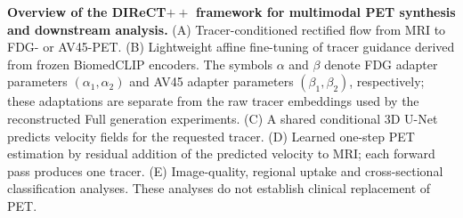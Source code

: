 \caption{\textbf{Overview of the DIReCT$++$ framework for multimodal PET synthesis and downstream analysis.}
(A) Tracer-conditioned rectified flow from MRI to FDG- or AV45-PET. (B) Lightweight affine fine-tuning of tracer guidance derived from frozen BiomedCLIP encoders. The symbols $\alpha$ and $\beta$ denote FDG adapter parameters $(\alpha_1,\alpha_2)$ and AV45 adapter parameters $(\beta_1,\beta_2)$, respectively; these adaptations are separate from the raw tracer embeddings used by the reconstructed Full generation experiments. (C) A shared conditional 3D U-Net predicts velocity fields for the requested tracer. (D) Learned one-step PET estimation by residual addition of the predicted velocity to MRI; each forward pass produces one tracer. (E) Image-quality, regional uptake and cross-sectional classification analyses. These analyses do not establish clinical replacement of PET.}
    \label{fig:1}
